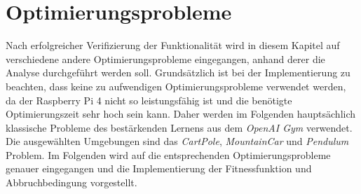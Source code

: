 \section{Optimierungsprobleme}
\label{sec:analysis_optimzation_problems}
Nach erfolgreicher Verifizierung der Funktionalität wird in diesem Kapitel auf verschiedene andere Optimierungsprobleme eingegangen, anhand derer die Analyse durchgeführt werden soll. Grundsätzlich ist bei der Implementierung zu beachten, dass keine zu aufwendigen Optimierungsprobleme verwendet werden, da der Raspberry Pi 4 nicht so leistungsfähig ist und die benötigte Optimierungszeit sehr hoch sein kann. Daher werden im Folgenden hauptsächlich klassische Probleme des bestärkenden Lernens aus dem \emph{OpenAI Gym} verwendet. Die ausgewählten Umgebungen sind das \emph{CartPole}, \emph{MountainCar} und \emph{Pendulum} Problem. Im Folgenden wird auf die entsprechenden Optimierungsprobleme genauer eingegangen und die Implementierung der Fitnessfunktion und Abbruchbedingung vorgestellt. 

